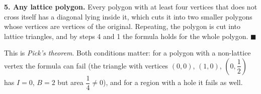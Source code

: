 \textbf{5. Any lattice polygon.} Every polygon with at least four vertices that does not cross itself has a diagonal lying inside it, which cuts it into two smaller polygons whose vertices are vertices of the original. Repeating, the polygon is cut into lattice triangles, and by steps 4 and 1 the formula holds for the whole polygon. $\blacksquare$

This is \emph{Pick's theorem}. Both conditions matter: for a polygon with a non-lattice vertex the formula can fail (the triangle with vertices $(0,0)$, $(1,0)$, $\left(0,\dfrac{1}{2}\right)$ has $I=0$, $B=2$ but area $\dfrac{1}{4}\ne0$), and for a region with a hole it fails as well.
